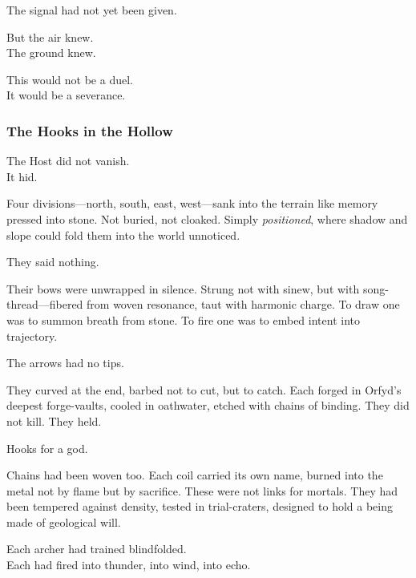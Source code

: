 \documentclass[12pt]{article}
\begin{document}
\vspace{0.5em}
The signal had not yet been given.

\vspace{0.5em}
But the air knew.\\
The ground knew.

\vspace{0.5em}
This would not be a duel.\\
It would be a severance.


\dotfill

\subsubsection{The Hooks in the Hollow}

The Host did not vanish.\\
It hid.

\vspace{0.5em}
Four divisions---north, south, east, west---sank into the terrain like memory pressed into stone. Not buried, not cloaked. Simply \textit{positioned}, where shadow and slope could fold them into the world unnoticed.

\vspace{0.5em}
They said nothing.

\vspace{0.5em}
Their bows were unwrapped in silence. Strung not with sinew, but with song-thread---fibered from woven resonance, taut with harmonic charge. To draw one was to summon breath from stone. To fire one was to embed intent into trajectory.

\vspace{0.5em}
The arrows had no tips.

\vspace{0.5em}
They curved at the end, barbed not to cut, but to catch. Each forged in Orfyd’s deepest forge-vaults, cooled in oathwater, etched with chains of binding. They did not kill. They held.

\vspace{0.5em}
Hooks for a god.

\vspace{0.5em}
Chains had been woven too. Each coil carried its own name, burned into the metal not by flame but by sacrifice. These were not links for mortals. They had been tempered against density, tested in trial-craters, designed to hold a being made of geological will.

\vspace{0.5em}
Each archer had trained blindfolded.\\
Each had fired into thunder, into wind, into echo.
\end{document}
